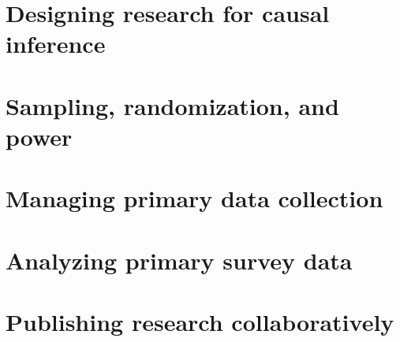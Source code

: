 \chapter{Designing research for causal inference}
\label{ch:3}




\chapter{Sampling, randomization, and power}
\label{ch:4}




\chapter{Managing primary data collection}
\label{ch:5}




\chapter{Analyzing primary survey data}
\label{ch:6}




\chapter{Publishing research collaboratively}
\label{ch:7}



